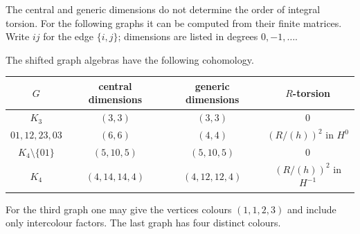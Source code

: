 The central and generic dimensions do not determine
the order of integral torsion. For the following
graphs it can be computed from their finite matrices.
Write \(ij\) for the edge \(\{i,j\}\); dimensions
are listed in degrees \(0,-1,\ldots\).

\begin{proposition}\label{cyidx:prop:graph-torsion}
The shifted graph algebras have the following cohomology.
\begin{center}
\begin{tabular}{c c c c}
\(G\)&central dimensions&generic dimensions&\(R\)-torsion\\\hline
\(K_3\)&\((3,3)\)&\((3,3)\)&0\\
\(01,12,23,03\)&\((6,6)\)&\((4,4)\)&\((R/(h))^2\) in \(H^0\)\\
\(K_4\setminus\{01\}\)&\((5,10,5)\)&\((5,10,5)\)&0\\
\(K_4\)&\((4,14,14,4)\)&\((4,12,12,4)\)&\((R/(h))^2\) in \(H^{-1}\)
\end{tabular}
\end{center}
For the third graph one may give the vertices colours
\((1,1,2,3)\) and include only intercolour factors.
The last graph has four distinct colours.
\end{proposition}
